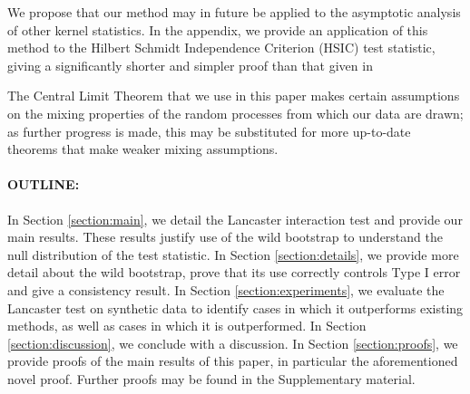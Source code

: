 \documentclass[]{article}
\begin{document}
We propose that our method may in future be applied to the asymptotic analysis of other kernel statistics. In the appendix, we provide an application of this method to the Hilbert Schmidt Independence Criterion (HSIC) test statistic, giving a significantly shorter and simpler proof than that given in \citet{chwialkowski2014kernel}

The Central Limit Theorem that we use in this paper makes certain assumptions on the mixing properties of the random processes from which our data are drawn; as further progress is made, this may be substituted for more up-to-date theorems that make weaker mixing assumptions.

\paragraph{OUTLINE:}
In Section \ref{section:main}, we detail the Lancaster interaction test and provide our main results. These results justify use of the wild bootstrap to understand the null distribution of the test statistic. In Section \ref{section:details}, we provide more detail about the wild bootstrap, prove that its use correctly controls Type I error and give a consistency result. In Section \ref{section:experiments}, we evaluate the Lancaster test on synthetic data to identify cases in which it outperforms existing methods, as well as cases in which it is outperformed. In Section \ref{section:discussion}, we conclude with a discussion. In Section \ref{section:proofs}, we provide proofs of the main results of this paper, in particular the aforementioned novel proof. Further proofs may be found in the Supplementary material.

\end{document}
